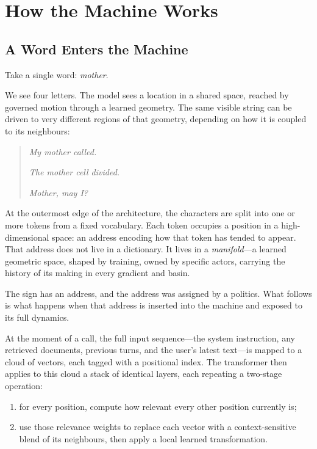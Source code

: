 
\chapter{How the Machine Works}
\thispagestyle{plain}

\bigskip

\section{A Word Enters the Machine}

Take a single word: \emph{mother}.

We see four letters. The model sees a location in a shared space, reached by governed motion through a learned geometry. The same visible string can be driven to very different regions of that geometry, depending on how it is coupled to its neighbours:

\begin{quote}
\emph{My mother called.}

\emph{The mother cell divided.}

\emph{Mother, may I?}
\end{quote}

At the outermost edge of the architecture, the characters are split into one or more tokens from a fixed vocabulary. Each token occupies a position in a high-dimensional space: an address encoding how that token has tended to appear. That address does not live in a dictionary. It lives in a \emph{manifold}---a learned geometric space, shaped by training, owned by specific actors, carrying the history of its making in every gradient and basin.

The sign has an address, and the address was assigned by a politics. What follows is what happens when that address is inserted into the machine and exposed to its full dynamics.

At the moment of a call, the full input sequence---the system instruction, any retrieved documents, previous turns, and the user's latest text---is mapped to a cloud of vectors, each tagged with a positional index. The transformer then applies to this cloud a stack of identical layers, each repeating a two-stage operation:

\begin{enumerate}
  \item for every position, compute how relevant every other position currently is;
  \item use those relevance weights to replace each vector with a context-sensitive blend of its neighbours, then apply a local learned transformation.
\end{enumerate}

